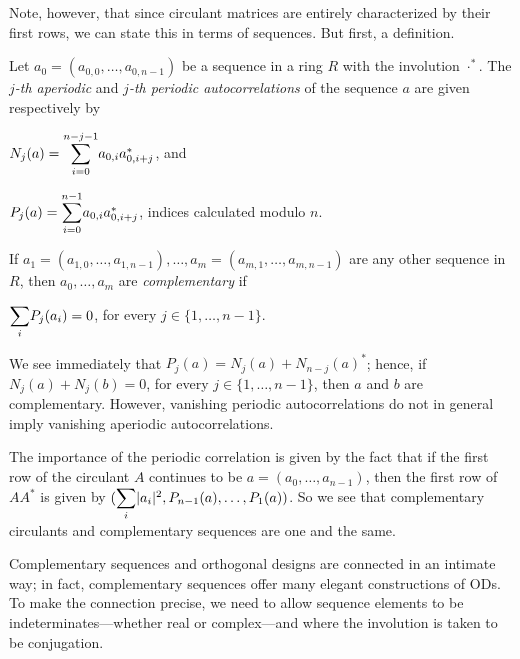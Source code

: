 \documentclass[../../../main]{subfiles}
\begin{document}
 Note, however, that since circulant matrices are entirely characterized by
 their first rows, we can state this in terms of sequences. But first, a definition.
 
 \begin{defin}
  Let $a_0=(a_{0,0}, \dots, a_{0,n-1})$ be a sequence in a ring $R$ with the
  involution $\cdot^*$. The {\it $j$-th aperiodic} and {\it $j$-th periodic
    autocorrelations} of the sequence $a$ are given respectively by 
  \begin{defenum}
   \item $N_j(a)=\ssum_{i=0}^{n-j-1}a_{0,i}a_{0,i+j}^*$, and
   \item $P_j(a)=\ssum_{i=0}^{n-1}a_{0,i}a_{0,i+j}^*$, indices calculated modulo $n$.
  \end{defenum}
  If $a_1=(a_{1,0},\dots,a_{1,n-1}),\dots,a_m=(a_{m,1},\dots,a_{m,n-1})$ are any
  other sequence in $R$, then $a_0,\dots,a_m$ are {\it
    complementary} if 
  \begin{defenum}[resume]
   \item\label{periodic-comp} $\ssum_i P_j(a_i)=0$, for every $j \in \{1, \dots, n-1\}$.
  \end{defenum}
 \end{defin}
 
 We see immediately that $P_j(a)=N_j(a) + N_{n-j}(a)^*$; hence, if
 $N_j(a)+N_j(b)=0$, for every $j \in \{1,\dots,n-1\}$, then $a$ and $b$ are
 complementary. However, vanishing periodic autocorrelations do not in general
 imply vanishing aperiodic autocorrelations. 
 
 The importance of the periodic correlation is given by the fact that if the
 first row of the circulant $A$ continues to be $a=(a_0,\dots,a_{n-1})$, then
 the first row of $AA^*$ is given by $(\ssum_i|a_i|^2,P_{n-1}(a),
 \dots,P_1(a))$. So we see that complementary circulants and complementary
 sequences are one and the same. 
 
 Complementary sequences and orthogonal designs are connected in an intimate
 way; in fact, complementary sequences offer many elegant constructions of ODs.
 To make the connection precise, we need to allow sequence elements to be
 indeterminates---whether real or complex---and where the
 involution is taken to be conjugation. 
 
\end{document}
